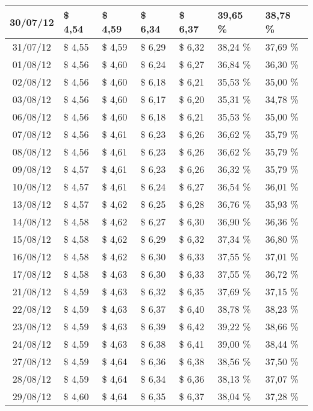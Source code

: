 \begin{center}
\begin{longtable}{|c|p{1.5cm}|p{1.5cm}|p{1.5cm}|p{1.5cm}|p{1.5cm}|p{1.5cm}|}
30/07/12 & \$ 4,54 & \$ 4,59 & \$ 6,34 & \$ 6,37 & 39,65 \% & 38,78 \% \\ \hline
31/07/12 & \$ 4,55 & \$ 4,59 & \$ 6,29 & \$ 6,32 & 38,24 \% & 37,69 \% \\ \hline
01/08/12 & \$ 4,56 & \$ 4,60 & \$ 6,24 & \$ 6,27 & 36,84 \% & 36,30 \% \\ \hline
02/08/12 & \$ 4,56 & \$ 4,60 & \$ 6,18 & \$ 6,21 & 35,53 \% & 35,00 \% \\ \hline
03/08/12 & \$ 4,56 & \$ 4,60 & \$ 6,17 & \$ 6,20 & 35,31 \% & 34,78 \% \\ \hline
06/08/12 & \$ 4,56 & \$ 4,60 & \$ 6,18 & \$ 6,21 & 35,53 \% & 35,00 \% \\ \hline
07/08/12 & \$ 4,56 & \$ 4,61 & \$ 6,23 & \$ 6,26 & 36,62 \% & 35,79 \% \\ \hline
08/08/12 & \$ 4,56 & \$ 4,61 & \$ 6,23 & \$ 6,26 & 36,62 \% & 35,79 \% \\ \hline
09/08/12 & \$ 4,57 & \$ 4,61 & \$ 6,23 & \$ 6,26 & 36,32 \% & 35,79 \% \\ \hline
10/08/12 & \$ 4,57 & \$ 4,61 & \$ 6,24 & \$ 6,27 & 36,54 \% & 36,01 \% \\ \hline
13/08/12 & \$ 4,57 & \$ 4,62 & \$ 6,25 & \$ 6,28 & 36,76 \% & 35,93 \% \\ \hline
14/08/12 & \$ 4,58 & \$ 4,62 & \$ 6,27 & \$ 6,30 & 36,90 \% & 36,36 \% \\ \hline
15/08/12 & \$ 4,58 & \$ 4,62 & \$ 6,29 & \$ 6,32 & 37,34 \% & 36,80 \% \\ \hline
16/08/12 & \$ 4,58 & \$ 4,62 & \$ 6,30 & \$ 6,33 & 37,55 \% & 37,01 \% \\ \hline
17/08/12 & \$ 4,58 & \$ 4,63 & \$ 6,30 & \$ 6,33 & 37,55 \% & 36,72 \% \\ \hline
21/08/12 & \$ 4,59 & \$ 4,63 & \$ 6,32 & \$ 6,35 & 37,69 \% & 37,15 \% \\ \hline
22/08/12 & \$ 4,59 & \$ 4,63 & \$ 6,37 & \$ 6,40 & 38,78 \% & 38,23 \% \\ \hline
23/08/12 & \$ 4,59 & \$ 4,63 & \$ 6,39 & \$ 6,42 & 39,22 \% & 38,66 \% \\ \hline
24/08/12 & \$ 4,59 & \$ 4,63 & \$ 6,38 & \$ 6,41 & 39,00 \% & 38,44 \% \\ \hline
27/08/12 & \$ 4,59 & \$ 4,64 & \$ 6,36 & \$ 6,38 & 38,56 \% & 37,50 \% \\ \hline
28/08/12 & \$ 4,59 & \$ 4,64 & \$ 6,34 & \$ 6,36 & 38,13 \% & 37,07 \% \\ \hline
29/08/12 & \$ 4,60 & \$ 4,64 & \$ 6,35 & \$ 6,37 & 38,04 \% & 37,28 \% \\ \hline

\end{longtable}
\end{center}
